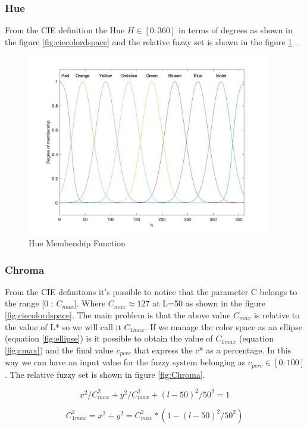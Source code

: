 \documentclass{article}
\begin{document}
\subsubsection{Hue}
From the CIE definition the Hue $H\in[0:360]$ in terms of degrees as shown in the figure \ref{fig:ciecolordspace} and the relative fuzzy set is shown in the figure \ref{fig:hue} .

\begin{figure}[!h]
	\center
 	\includegraphics[width=300pt]{./img/inputFuzzyH}
  	\caption{Hue Membership Function}\label{fig:hue}
\end{figure}

\subsubsection{Chroma}
From the CIE definitions it's possible to notice that the parameter C belongs to the range [0 : $C_{max}$]. Where $C_{max}\approx{127}$ at L=50 as shown in the figure \ref{fig:ciecolordspace}.
The main problem is that the above value $C_{max}$ is relative to the value of L* so we will call it $C_{1max}$. If we manage the color space as an ellipse (equation \ref{fig:ellipse}) is it possible to obtain the value of $C_{1max}$ (equation \ref{fig:cmax}) and the final value $c_{perc}$ that express the c* as a percentage. In this way we can have an input value for the fuzzy system belonging as $c_{perc}\in[0:100]$. The relative fuzzy set is shown in figure \ref{fig:Chroma}.


\begin{equation}\label{fig:ellipse}
	x^2/C_{max}^2 + y^2/C_{max}^2 + (l-50)^2/50^2=1
\end{equation}	

\begin{equation}\label{fig:cmax}
	C_{1max}^2= x^2 + y^2 =C_{max}^2 * (1- (l-50)^2/50^2)
\end{equation}	
\end{document}
